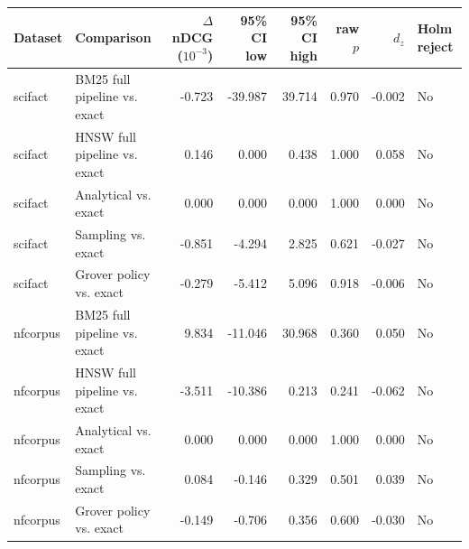\begin{tabular}{llrrrrrl}
\toprule
Dataset & Comparison & $\Delta$ nDCG ($10^{-3}$) & 95\% CI low & 95\% CI high & raw $p$ & $d_z$ & Holm reject\\
\midrule
scifact & BM25 full pipeline vs. exact & -0.723 & -39.987 & 39.714 & 0.970 & -0.002 & No\\
scifact & HNSW full pipeline vs. exact & 0.146 & 0.000 & 0.438 & 1.000 & 0.058 & No\\
scifact & Analytical vs. exact & 0.000 & 0.000 & 0.000 & 1.000 & 0.000 & No\\
scifact & Sampling vs. exact & -0.851 & -4.294 & 2.825 & 0.621 & -0.027 & No\\
scifact & Grover policy vs. exact & -0.279 & -5.412 & 5.096 & 0.918 & -0.006 & No\\
nfcorpus & BM25 full pipeline vs. exact & 9.834 & -11.046 & 30.968 & 0.360 & 0.050 & No\\
nfcorpus & HNSW full pipeline vs. exact & -3.511 & -10.386 & 0.213 & 0.241 & -0.062 & No\\
nfcorpus & Analytical vs. exact & 0.000 & 0.000 & 0.000 & 1.000 & 0.000 & No\\
nfcorpus & Sampling vs. exact & 0.084 & -0.146 & 0.329 & 0.501 & 0.039 & No\\
nfcorpus & Grover policy vs. exact & -0.149 & -0.706 & 0.356 & 0.600 & -0.030 & No\\
\bottomrule
\end{tabular}
